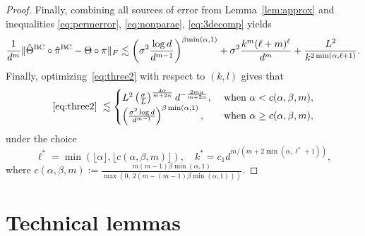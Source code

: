 \documentclass[12pt]{article}
\theoremstyle{definition}
\begin{document}
\begin{proof}
Finally, combining all sources of error from Lemma~\ref{lem:approx} and inequalities \eqref{eq:permerror}, \eqref{eq:nonparae}, \eqref{eq:3decomp} yields
\begin{align}\label{eq:three2}
    \frac{1}{d^m} \lVert\hat\Theta^{\text{BC}}\circ \hat\pi^{\text{BC}}-\Theta\circ\pi\rVert_F\lesssim \left(\sigma^2{\log d\over d^{m-1}}\right)^{\beta{\min(\alpha,1)}}+ \sigma^2 \frac{k^m(\ell+m)^\ell}{d^m}+ \frac{L^2}{k^{2\min(\alpha,\ell+1)}}.
\end{align}
Finally, optimizing~\eqref{eq:three2} with respect to $(k,l)$ gives that 
\begin{align}
     \eqref{eq:three2}\ \lesssim 
     \begin{cases} 
    L^2\left({\sigma\over L}\right)^{4\alpha\over m+2\alpha} d^{-\frac{2m\alpha}{m+2\alpha}}, & \text{ when } \alpha <c(\alpha,\beta,m),\\
    \left( \sigma^2 \log d\over d^{m-1}\right)^{\beta\min(\alpha,1)}, &\text{ when } \alpha \geq c(\alpha,\beta,m),
    \end{cases}
\end{align}
under the choice
\[
\ell^* = \min\left(\lfloor\alpha\rfloor,\lfloor c(\alpha,\beta,m)\rfloor\right),\quad k^* = c_1d^{m/ (m+2\min(\alpha,\ell^*+1))},
\]
where $c(\alpha,\beta,m):= \frac{m(m-1)\beta\min(\alpha,1)}{\max(0,\ 2(m-(m-1)\beta\min(\alpha,1)))}$.

\end{proof}

\section{Technical lemmas}\label{sec:tech}
\end{document}
